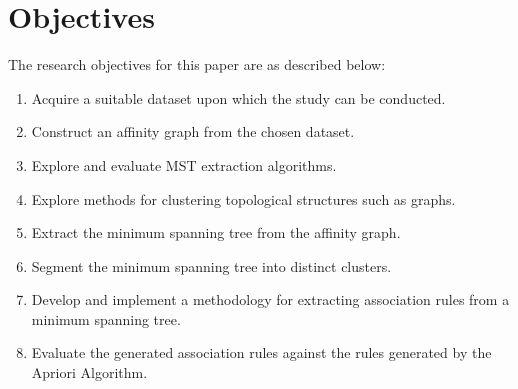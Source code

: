\section{Objectives}
The research objectives for this paper are as described below:
\begin{enumerate}
\item Acquire a suitable dataset upon which the study can be conducted.
\item Construct an affinity graph from the chosen dataset.
\item Explore and evaluate MST extraction algorithms.
\item Explore methods for clustering topological structures such as graphs.
\item Extract the minimum spanning tree from the affinity graph.
\item Segment the minimum spanning tree into distinct clusters.
\item Develop and implement a methodology for extracting association rules from a minimum spanning tree.
\item Evaluate the generated association rules against the rules generated by the Apriori Algorithm.
\end{enumerate}